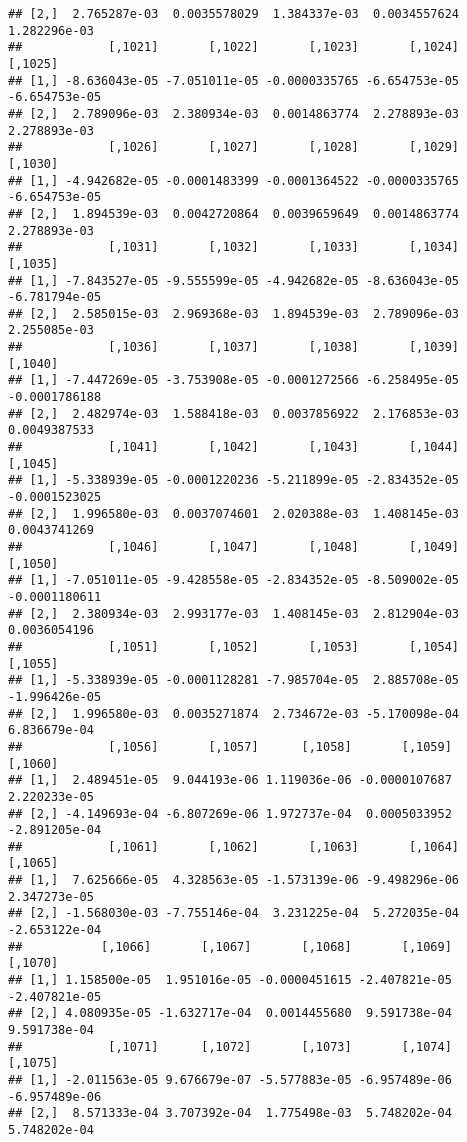 \documentclass[
]{article}
\begin{document}
\begin{verbatim}
## [2,]  2.765287e-03  0.0035578029  1.384337e-03  0.0034557624  1.282296e-03
##            [,1021]       [,1022]       [,1023]       [,1024]       [,1025]
## [1,] -8.636043e-05 -7.051011e-05 -0.0000335765 -6.654753e-05 -6.654753e-05
## [2,]  2.789096e-03  2.380934e-03  0.0014863774  2.278893e-03  2.278893e-03
##            [,1026]       [,1027]       [,1028]       [,1029]       [,1030]
## [1,] -4.942682e-05 -0.0001483399 -0.0001364522 -0.0000335765 -6.654753e-05
## [2,]  1.894539e-03  0.0042720864  0.0039659649  0.0014863774  2.278893e-03
##            [,1031]       [,1032]       [,1033]       [,1034]       [,1035]
## [1,] -7.843527e-05 -9.555599e-05 -4.942682e-05 -8.636043e-05 -6.781794e-05
## [2,]  2.585015e-03  2.969368e-03  1.894539e-03  2.789096e-03  2.255085e-03
##            [,1036]       [,1037]       [,1038]       [,1039]       [,1040]
## [1,] -7.447269e-05 -3.753908e-05 -0.0001272566 -6.258495e-05 -0.0001786188
## [2,]  2.482974e-03  1.588418e-03  0.0037856922  2.176853e-03  0.0049387533
##            [,1041]       [,1042]       [,1043]       [,1044]       [,1045]
## [1,] -5.338939e-05 -0.0001220236 -5.211899e-05 -2.834352e-05 -0.0001523025
## [2,]  1.996580e-03  0.0037074601  2.020388e-03  1.408145e-03  0.0043741269
##            [,1046]       [,1047]       [,1048]       [,1049]       [,1050]
## [1,] -7.051011e-05 -9.428558e-05 -2.834352e-05 -8.509002e-05 -0.0001180611
## [2,]  2.380934e-03  2.993177e-03  1.408145e-03  2.812904e-03  0.0036054196
##            [,1051]       [,1052]       [,1053]       [,1054]       [,1055]
## [1,] -5.338939e-05 -0.0001128281 -7.985704e-05  2.885708e-05 -1.996426e-05
## [2,]  1.996580e-03  0.0035271874  2.734672e-03 -5.170098e-04  6.836679e-04
##            [,1056]       [,1057]      [,1058]       [,1059]       [,1060]
## [1,]  2.489451e-05  9.044193e-06 1.119036e-06 -0.0000107687  2.220233e-05
## [2,] -4.149693e-04 -6.807269e-06 1.972737e-04  0.0005033952 -2.891205e-04
##            [,1061]       [,1062]       [,1063]       [,1064]       [,1065]
## [1,]  7.625666e-05  4.328563e-05 -1.573139e-06 -9.498296e-06  2.347273e-05
## [2,] -1.568030e-03 -7.755146e-04  3.231225e-04  5.272035e-04 -2.653122e-04
##           [,1066]       [,1067]       [,1068]       [,1069]       [,1070]
## [1,] 1.158500e-05  1.951016e-05 -0.0000451615 -2.407821e-05 -2.407821e-05
## [2,] 4.080935e-05 -1.632717e-04  0.0014455680  9.591738e-04  9.591738e-04
##            [,1071]      [,1072]       [,1073]       [,1074]       [,1075]
## [1,] -2.011563e-05 9.676679e-07 -5.577883e-05 -6.957489e-06 -6.957489e-06
## [2,]  8.571333e-04 3.707392e-04  1.775498e-03  5.748202e-04  5.748202e-04

\end{verbatim}
\end{document}
